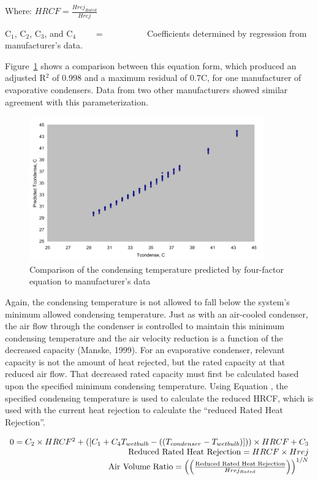 Where: $HRCF = \frac{Hrej_{Rated}}{Hrej}$

C\(_{1}\), C\(_{2}\), C\(_{3}\), and C\(_{4}\)~~~~ = ~~~~~~~~~ Coefficients determined by regression from manufacturer's data.

Figure~\ref{fig:comparison-of-the-condensing-temperature} shows a comparison between this equation form, which produced an adjusted R\(^{2}\) of 0.998 and a maximum residual of 0.7C, for one manufacturer of evaporative condensers. Data from two other manufacturers showed similar agreement with this parameterization.

\begin{figure}[hbtp] %
\centering
\includegraphics[width=0.9\textwidth, height=0.9\textheight, keepaspectratio=true]{media/image6301.svg.png}
\caption{Comparison of the condensing temperature predicted by four-factor equation to manufacturer's data \protect \label{fig:comparison-of-the-condensing-temperature}}
\end{figure}

Again, the condensing temperature is not allowed to fall below the system's minimum allowed condensing temperature. Just as with an air-cooled condenser, the air flow through the condenser is controlled to maintain this minimum condensing temperature and the air velocity reduction is a function of the decreased capacity (Manske, 1999). For an evaporative condenser, relevant capacity is not the amount of heat rejected, but the rated capacity at that reduced air flow. That decreased rated capacity must first be calculated based upon the specified minimum condensing temperature. Using Equation , the specified condensing temperature is used to calculate the reduced HRCF, which is used with the current heat rejection to calculate the ``reduced Rated Heat Rejection''.

\begin{equation}
  \begin{array}{rl}
    0 = C_2 \times HRCF^2 + \left( \left[C_1 + C_4 T_{wetbulb} - \left( \left(T_{condenser} - T_{wetbulb}\right)\right]\right) \right) \times HRCF + C_3 \\
    \text{Reduced Rated Heat Rejection} = HRCF \times Hrej \\
    \text{Air Volume Ratio} = \left( \left(\frac{\text{Reduced Rated Heat Rejection}}{Hrej_{Rated}}\right)\right) ^{1/N}
  \end{array}
\end{equation}

